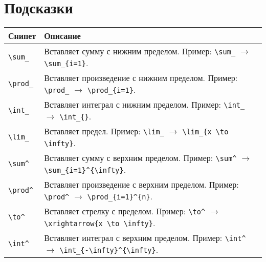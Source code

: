 \documentclass[a4paper]{article}
\begin{document}
\section{Подсказки}
\begin{longtable}{|p{3cm}|p{10cm}|}
    \hline
    \textbf{Снипет} & \textbf{Описание} \\
    \hline
    \verb|\sum_| & Вставляет сумму с нижним пределом. Пример: \verb|\sum_| $\rightarrow$ \verb|\sum_{i=1}|. \\
    \hline
    \verb|\prod_| & Вставляет произведение с нижним пределом. Пример: \verb|\prod_| $\rightarrow$ \verb|\prod_{i=1}|. \\
    \hline
    \verb|\int_| & Вставляет интеграл с нижним пределом. Пример: \verb|\int_| $\rightarrow$ \verb|\int_{}|. \\
    \hline
    \verb|\lim_| & Вставляет предел. Пример: \verb|\lim_| $\rightarrow$ \verb|\lim_{x \to \infty}|. \\
    \hline
    \verb|\sum^| & Вставляет сумму с верхним пределом. Пример: \verb|\sum^| $\rightarrow$ \verb|\sum_{i=1}^{\infty}|. \\
    \hline
    \verb|\prod^| & Вставляет произведение с верхним пределом. Пример: \verb|\prod^| $\rightarrow$ \verb|\prod_{i=1}^{n}|. \\
    \hline
    \verb|\to^| & Вставляет стрелку с пределом. Пример: \verb|\to^| $\rightarrow$ \verb|\xrightarrow{x \to \infty}|. \\
    \hline
    \verb|\int^| & Вставляет интеграл с верхним пределом. Пример: \verb|\int^| $\rightarrow$ \verb|\int_{-\infty}^{\infty}|. \\
    \hline
\end{longtable}
\end{document}
